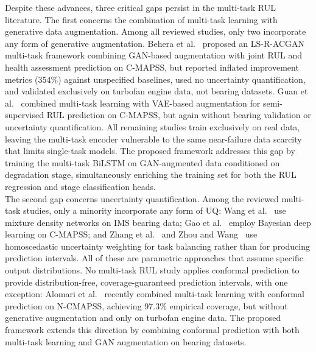 \documentclass[review]{elsarticle}
\begin{document}
Despite these advances, three critical gaps persist in the
multi-task RUL literature. The first concerns the combination of
multi-task learning with generative data augmentation. Among all
reviewed studies, only two incorporate any form of generative
augmentation.
Behera et al.~\cite{10107629} proposed an LS-R-ACGAN multi-task
framework combining GAN-based augmentation with joint RUL and
health assessment prediction on C-MAPSS, but reported inflated
improvement metrics (354\%) against unspecified baselines, used no
uncertainty quantification, and validated exclusively on turbofan
engine data, not bearing datasets.
Guan et al.~\cite{guan_enhanced_2026} combined multi-task learning
with VAE-based augmentation for semi-supervised RUL prediction on
C-MAPSS, but again without bearing validation or uncertainty
quantification. All remaining studies train exclusively on real data,
leaving the multi-task encoder vulnerable to the same near-failure
data scarcity that limits single-task models. The proposed framework
addresses this gap by training the multi-task BiLSTM on
GAN-augmented data conditioned on degradation stage, simultaneously
enriching the training set for both the RUL regression and stage
classification heads.\\

The second gap concerns uncertainty quantification. Among the
reviewed multi-task studies, only a minority incorporate any form
of UQ: Wang et al.~\cite{wang_multi-task_2024} use mixture density
networks on IMS bearing data;
Gao et al.~\cite{gao_bmtr-former_2026} employ Bayesian deep learning
on C-MAPSS; and
Zhang et al.~\cite{zhang_health_2022} and
Zhou and Wang~\cite{zhou_adaptive_2024} use homoscedastic uncertainty
weighting for task balancing rather than for producing prediction
intervals. All of these are parametric approaches that assume
specific output distributions. No multi-task RUL study applies
conformal prediction to provide distribution-free,
coverage-guaranteed prediction intervals, with one exception:
Alomari et al.~\cite{11488562} recently combined multi-task learning
with conformal prediction on N-CMAPSS, achieving 97.3\% empirical
coverage, but without generative augmentation and only on turbofan
engine data. The proposed framework extends this direction by
combining conformal prediction with both multi-task learning and GAN
augmentation on bearing datasets.\\
\end{document}
